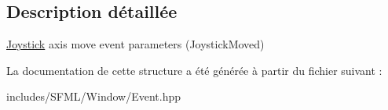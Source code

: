 \subsection{Description détaillée}
\hyperlink{classsf_1_1Joystick}{Joystick} axis move event parameters (Joystick\+Moved) 

La documentation de cette structure a été générée à partir du fichier suivant \+:\begin{DoxyCompactItemize}
\item 
includes/\+S\+F\+M\+L/\+Window/Event.\+hpp\end{DoxyCompactItemize}
